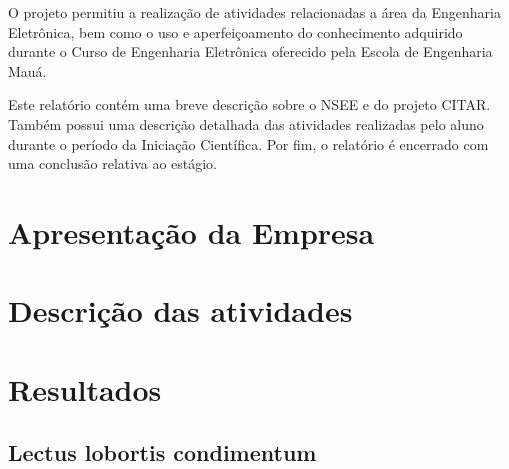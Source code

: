 \documentclass[
	12pt,				%
	openright,			%
	twoside,			%
	a4paper,			%
	english,			%
	french,				%
	spanish,			%
	brazil				%
	]{abntex2}
\begin{document}
	O projeto permitiu a realização de atividades relacionadas a área da Engenharia Eletrônica, bem como o uso e aperfeiçoamento do conhecimento adquirido durante o Curso de Engenharia Eletrônica oferecido pela Escola de Engenharia Mauá.
	
	Este relatório contém uma breve descrição sobre o NSEE e do projeto CITAR. Também possui uma descrição detalhada das atividades realizadas pelo aluno durante o período da Iniciação Científica. Por fim, o relatório é encerrado com uma conclusão relativa ao estágio.
	

\part{Apresentação da Empresa}





%

\part{Descrição das atividades}



\part{Resultados}

\chapter{Lectus lobortis condimentum}
\end{document}
